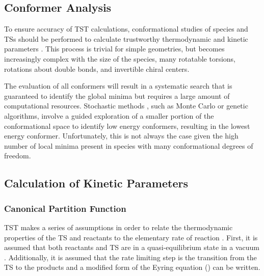 \documentclass[preprint, 11pt]{elsarticle} %
\begin{document}

\subsection{Conformer Analysis}

To ensure accuracy of TST calculations, conformational studies of species and TSs should be performed to calculate trustworthy thermodynamic and kinetic parameters \cite{Allen:1993, Csaszar:1998}.
This process is trivial for simple geometries, but becomes increasingly complex with the size of the species, many rotatable torsions, rotations about double bonds, and invertible chiral centers.

The evaluation of all conformers will result in a systematic search that is guaranteed to identify the global minima but requires a large amount of computational resources.
Stochastic methods \cite{Ebejer:2012}, such as Monte Carlo or genetic algorithms, involve a guided exploration of a smaller portion of the conformational space to identify low energy conformers, resulting in the lowest energy conformer.
Unfortunately, this is not always the case given the high number of local minima present in species with many conformational degrees of freedom.
\subsection{Calculation of Kinetic Parameters}

\subsubsection{Canonical Partition Function}

TST makes a series of assumptions in order to relate the thermodynamic properties of the TS and reactants to the elementary rate of reaction \cite{eyring:1935}. 
First, it is assumed that both reactants and TS are in a quasi-equilibrium state in a vacuum \cite{QSS:2017}.
Additionally, it is assumed that the rate limiting step is the transition from the TS to the products and a modified form of the Eyring equation () can be written.
\end{document}
